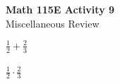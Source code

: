 \documentclass{article}
\begin{document}
\begin{center}
    \Large \textbf{Math 115E Activity 9} \\
    \vspace{0.2cm}
    \normalsize Miscellaneous Review
\end{center}
\vspace{1cm} %

\noindent
$\frac{1}{2} + \frac{2}{3}$
\\\\
\noindent
$\frac{1}{2} \cdot \frac{2}{3}$
\end{document}

